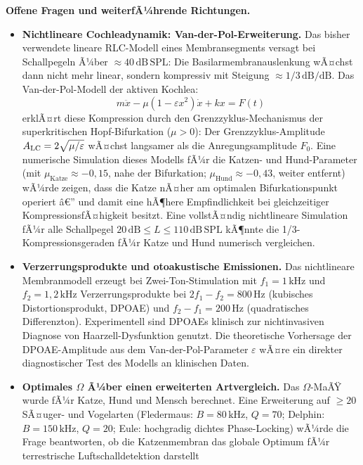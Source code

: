 ﻿\documentclass[12pt,a4paper,titlepage]{report}
\begin{document}
\textbf{Offene Fragen und weiterfÃ¼hrende Richtungen.}
\begin{itemize}[leftmargin=2em]
  \item \textbf{Nichtlineare Cochleadynamik: Van-der-Pol-Erweiterung.}
    Das bisher verwendete lineare RLC-Modell eines Membransegments
    versagt bei Schallpegeln Ã¼ber $\approx 40\,\mathrm{dB\,SPL}$:
    Die Basilarmembranauslenkung wÃ¤chst dann nicht mehr linear,
    sondern kompressiv mit Steigung $\approx 1/3\,\mathrm{dB/dB}$.
    Das Van-der-Pol-Modell der aktiven Kochlea:
    \[
      m\ddot{x} - \mu(1-\varepsilon x^2)\dot{x} + kx = F(t)
    \]
    erklÃ¤rt diese Kompression durch den Grenzzyklus-Mechanismus
    der superkritischen Hopf-Bifurkation ($\mu > 0$):
    Der Grenzzyklus-Amplitude
    $A_{\rm LC} = 2\sqrt{\mu/\varepsilon}$
    wÃ¤chst langsamer als die Anregungsamplitude $F_0$.
    Eine numerische Simulation dieses Modells fÃ¼r die
    Katzen- und Hund-Parameter (mit $\mu_\mathrm{Katze} \approx -0{,}15$,
    nahe der Bifurkation; $\mu_\mathrm{Hund} \approx -0{,}43$,
    weiter entfernt) wÃ¼rde zeigen, dass die Katze nÃ¤her am
    optimalen Bifurkationspunkt operiert â€” und damit eine
    hÃ¶here Empfindlichkeit bei gleichzeitiger KompressionsfÃ¤higkeit besitzt.
    Eine vollstÃ¤ndig nichtlineare Simulation fÃ¼r alle Schallpegel
    $20\,\mathrm{dB} \leq L \leq 110\,\mathrm{dB\,SPL}$
    kÃ¶nnte die 1/3-Kompressionsgeraden fÃ¼r Katze und Hund numerisch
    vergleichen.
  \item \textbf{Verzerrungsprodukte und otoakustische Emissionen.}
    Das nichtlineare Membranmodell erzeugt bei Zwei-Ton-Stimulation
    mit $f_1=1\,\mathrm{kHz}$ und $f_2=1{,}2\,\mathrm{kHz}$
    Verzerrungsprodukte bei $2f_1-f_2 = 800\,\mathrm{Hz}$
    (kubisches Distortionsprodukt, DPOAE) und $f_2-f_1=200\,\mathrm{Hz}$
    (quadratisches Differenzton).
    Experimentell sind DPOAEs klinisch zur nichtinvasiven
    Diagnose von Haarzell-Dysfunktion genutzt.
    Die theoretische Vorhersage der DPOAE-Amplitude aus dem
    Van-der-Pol-Parameter $\varepsilon$ wÃ¤re ein direkter
    diagnostischer Test des Modells an klinischen Daten.
  \item \textbf{Optimales $\Omega$ Ã¼ber einen erweiterten Artvergleich.}
    Das $\Omega$-MaÃŸ wurde fÃ¼r Katze, Hund und Mensch berechnet.
    Eine Erweiterung auf $\geq 20$ SÃ¤uger- und Vogelarten
    (Fledermaus: $B=80\,\mathrm{kHz}$, $Q=70$;
    Delphin: $B=150\,\mathrm{kHz}$, $Q=20$;
    Eule: hochgradig dichtes Phase-Locking)
    wÃ¼rde die Frage beantworten, ob die Katzenmembran
    das globale Optimum fÃ¼r terrestrische Luftschalldetektion darstellt

\end{itemize}
\end{document}
